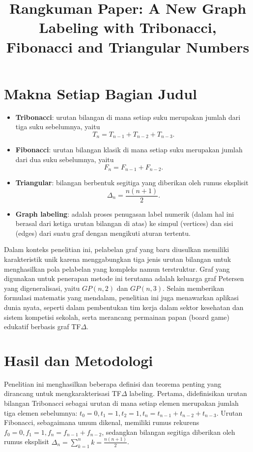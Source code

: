 \documentclass[12pt]{article}
\title{Rangkuman Paper: A New Graph Labeling with Tribonacci, Fibonacci and Triangular Numbers}
\author{}
\date{}
\begin{document}
\maketitle
\onehalfspacing

\section{Makna Setiap Bagian Judul}

\begin{itemize}
    \item \textbf{Tribonacci}: urutan bilangan di mana setiap suku merupakan jumlah dari tiga suku sebelumnya, yaitu
    \[
    T_n = T_{n-1} + T_{n-2} + T_{n-3}.
    \]

    \item \textbf{Fibonacci}: urutan bilangan klasik di mana setiap suku merupakan jumlah dari dua suku sebelumnya, yaitu
    \[
    F_n = F_{n-1} + F_{n-2}.
    \]

    \item \textbf{Triangular}: bilangan berbentuk segitiga yang diberikan oleh rumus eksplisit
    \[
    \Delta_n = \frac{n(n+1)}{2}.
    \]

    \item \textbf{Graph labeling}: adalah proses penugasan label numerik (dalam hal ini berasal dari ketiga urutan bilangan di atas) ke simpul (vertices) dan sisi (edges) dari suatu graf dengan mengikuti aturan tertentu.
\end{itemize}
Dalam konteks penelitian ini, pelabelan graf yang baru diusulkan memiliki karakteristik unik karena menggabungkan tiga jenis urutan bilangan untuk menghasilkan pola pelabelan yang kompleks namun terstruktur. Graf yang digunakan untuk penerapan metode ini terutama adalah keluarga graf Petersen yang digeneralisasi, yaitu $GP(n,2)$ dan $GP(n,3)$. Selain memberikan formulasi matematis yang mendalam, penelitian ini juga menawarkan aplikasi dunia nyata, seperti dalam pembentukan tim kerja dalam sektor kesehatan dan sistem kompetisi sekolah, serta merancang permainan papan (board game) edukatif berbasis graf TF$\Delta$.

\section{Hasil dan Metodologi}
Penelitian ini menghasilkan beberapa definisi dan teorema penting yang dirancang untuk mengkarakterisasi TF$\Delta$ labeling. Pertama, didefinisikan urutan bilangan Tribonacci sebagai urutan di mana setiap elemen merupakan jumlah tiga elemen sebelumnya: $t_0 = 0, t_1 = 1, t_2 = 1, t_n = t_{n-1} + t_{n-2} + t_{n-3}$. Urutan Fibonacci, sebagaimana umum dikenal, memiliki rumus rekurens $f_0 = 0, f_1 = 1, f_n = f_{n-1} + f_{n-2}$, sedangkan bilangan segitiga diberikan oleh rumus eksplisit $\Delta_n = \sum_{k=1}^n k = \frac{n(n+1)}{2}$.
\end{document}
